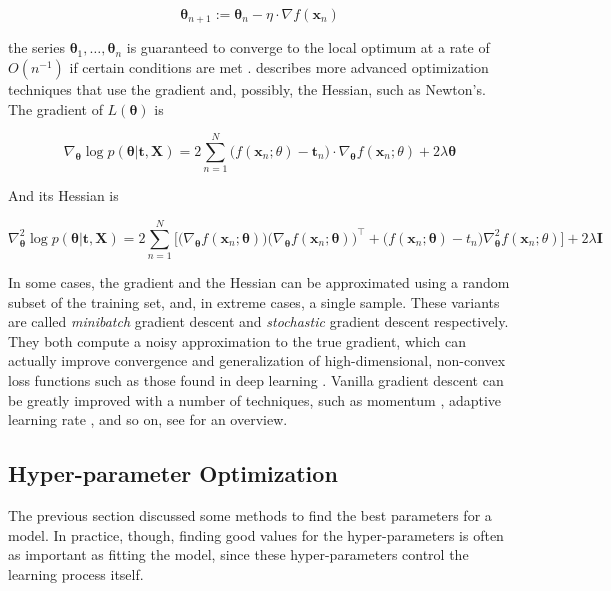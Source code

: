 \documentclass[a4paper]{book}
\begin{document}
\begin{equation}
\bm\theta_{n+1}:=\bm\theta_n-\eta\cdot\nabla f(\bm x_n)
\end{equation}

the series $\bm\theta_1,\ldots,\bm\theta_n$ is guaranteed to converge to the local optimum at a rate of $O(n^{-1})$ if certain conditions are met \citep{gd_convergence}. \cite{numopt} describes more advanced optimization techniques that use the gradient and, possibly, the Hessian, such as Newton's. The gradient of $L(\bm\theta)$ is

\begin{equation}
\label{eq:least_squares_gradient}
\nabla_{\bm\theta}\log p(\bm\theta\vert\bm t,\bm X)
=2\sum_{n=1}^N \big(f(\bm x_n;\theta)-\bm t_n\big)\cdot\nabla_{\bm\theta}f(\bm x_n;\theta) + 2\lambda\bm\theta
\end{equation}

And its Hessian is

\begin{equation}
\label{eq:least_squares_hessian}
\nabla^2_{\bm\theta}\log p(\bm\theta\vert\bm t,\bm X)=2\sum_{n=1}^{N}\bigg[
\big(\nabla_{\bm\theta} f(\bm x_n;\bm\theta)\big)
\big(\nabla_{\bm\theta} f(\bm x_n;\bm\theta)\big)^\intercal
+\big(f(\bm x_n;\bm\theta)-t_n\big)\nabla^2_{\bm\theta}f(\bm x_n;\theta)\bigg]+2\lambda\bm I
\end{equation}

In some cases, the gradient and the Hessian can be approximated using a random subset of the training set, and, in extreme cases, a single sample. These variants are called \emph{minibatch} gradient descent and \emph{stochastic} gradient descent respectively. They both compute a noisy approximation to the true gradient, which can actually improve convergence and generalization of high-dimensional, non-convex loss functions such as those found in deep learning \citep{sgd_noise, bayesian_sgd}. Vanilla gradient descent can be greatly improved with a number of techniques, such as momentum \citep{gd_momentum}, adaptive learning rate \citep{adagrad, adadelta, adam}, and so on, see \cite{gd_overview} for an overview. 

\subsection{Hyper-parameter Optimization}
The previous section discussed some methods to find the best parameters for a model. In practice, though, finding good values for the hyper-parameters is often as important as fitting the model, since these hyper-parameters control the learning process itself.
\end{document}
